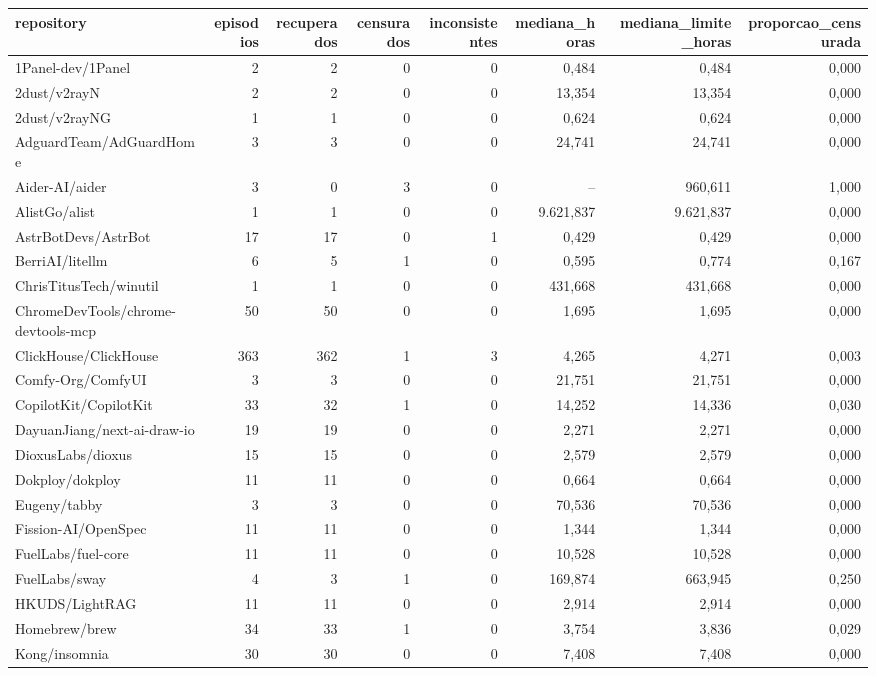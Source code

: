 \begin{tabular}{lrrrrrrr}
\hline
repository & episodios & recuperados & censurados & inconsistentes & mediana\_horas & mediana\_limite\_horas & proporcao\_censurada \\
\hline
1Panel-dev/1Panel & 2 & 2 & 0 & 0 & 0,484 & 0,484 & 0,000 \\
2dust/v2rayN & 2 & 2 & 0 & 0 & 13,354 & 13,354 & 0,000 \\
2dust/v2rayNG & 1 & 1 & 0 & 0 & 0,624 & 0,624 & 0,000 \\
AdguardTeam/AdGuardHome & 3 & 3 & 0 & 0 & 24,741 & 24,741 & 0,000 \\
Aider-AI/aider & 3 & 0 & 3 & 0 & -- & 960,611 & 1,000 \\
AlistGo/alist & 1 & 1 & 0 & 0 & 9.621,837 & 9.621,837 & 0,000 \\
AstrBotDevs/AstrBot & 17 & 17 & 0 & 1 & 0,429 & 0,429 & 0,000 \\
BerriAI/litellm & 6 & 5 & 1 & 0 & 0,595 & 0,774 & 0,167 \\
ChrisTitusTech/winutil & 1 & 1 & 0 & 0 & 431,668 & 431,668 & 0,000 \\
ChromeDevTools/chrome-devtools-mcp & 50 & 50 & 0 & 0 & 1,695 & 1,695 & 0,000 \\
ClickHouse/ClickHouse & 363 & 362 & 1 & 3 & 4,265 & 4,271 & 0,003 \\
Comfy-Org/ComfyUI & 3 & 3 & 0 & 0 & 21,751 & 21,751 & 0,000 \\
CopilotKit/CopilotKit & 33 & 32 & 1 & 0 & 14,252 & 14,336 & 0,030 \\
DayuanJiang/next-ai-draw-io & 19 & 19 & 0 & 0 & 2,271 & 2,271 & 0,000 \\
DioxusLabs/dioxus & 15 & 15 & 0 & 0 & 2,579 & 2,579 & 0,000 \\
Dokploy/dokploy & 11 & 11 & 0 & 0 & 0,664 & 0,664 & 0,000 \\
Eugeny/tabby & 3 & 3 & 0 & 0 & 70,536 & 70,536 & 0,000 \\
Fission-AI/OpenSpec & 11 & 11 & 0 & 0 & 1,344 & 1,344 & 0,000 \\
FuelLabs/fuel-core & 11 & 11 & 0 & 0 & 10,528 & 10,528 & 0,000 \\
FuelLabs/sway & 4 & 3 & 1 & 0 & 169,874 & 663,945 & 0,250 \\
HKUDS/LightRAG & 11 & 11 & 0 & 0 & 2,914 & 2,914 & 0,000 \\
Homebrew/brew & 34 & 33 & 1 & 0 & 3,754 & 3,836 & 0,029 \\
Kong/insomnia & 30 & 30 & 0 & 0 & 7,408 & 7,408 & 0,000 \\

\end{tabular}

